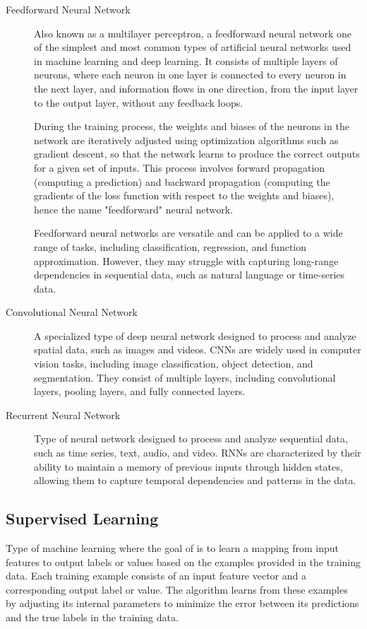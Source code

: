 \documentclass[a4paper]{article}
\begin{document}
\begin{description}
\item[Feedforward Neural Network]
Also known as a multilayer perceptron, a feedforward neural network one of the simplest and most common types of artificial neural networks used in machine learning and deep learning. It consists of multiple layers of neurons, where each neuron in one layer is connected to every neuron in the next layer, and information flows in one direction, from the input layer to the output layer, without any feedback loops.

During the training process, the weights and biases of the neurons in the network are iteratively adjusted using optimization algorithms such as gradient descent, so that the network learns to produce the correct outputs for a given set of inputs. This process involves forward propagation (computing a prediction) and backward propagation (computing the gradients of the loss function with respect to the weights and biases), hence the name "feedforward" neural network.

Feedforward neural networks are versatile and can be applied to a wide range of tasks, including classification, regression, and function approximation. However, they may struggle with capturing long-range dependencies in sequential data, such as natural language or time-series data.

\item[Convolutional Neural Network] 
A specialized type of deep neural network designed to process and analyze spatial data, such as images and videos. CNNs are widely used in computer vision tasks, including image classification, object detection, and segmentation. They consist of multiple layers, including convolutional layers, pooling layers, and fully connected layers.

\item[Recurrent Neural Network]
Type of neural network designed to process and analyze sequential data, such as time series, text, audio, and video. RNNs are characterized by their ability to maintain a memory of previous inputs through hidden states, allowing them to capture temporal dependencies and patterns in the data.
\end{description}


\subsection*{Supervised Learning}
Type of machine learning where the goal of is to learn a mapping from input features to output labels or values based on the examples provided in the training data. Each training example consists of an input feature vector and a corresponding output label or value. The algorithm learns from these examples by adjusting its internal parameters to minimize the error between its predictions and the true labels in the training data.
\end{document}
